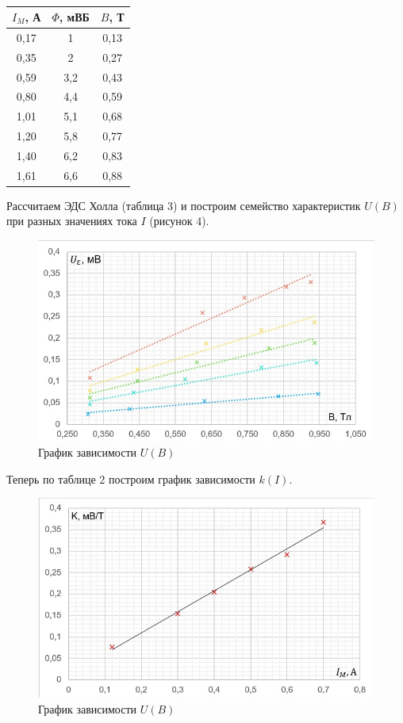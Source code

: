 \documentclass[a4paper]{article}
\theoremstyle{definition}
\theoremstyle{remark}
\begin{document}
    \begin{table}[h!]
        \caption{}
        \centering
        \begin{tabular}{|c|c|c|}
        \hline
        \multicolumn{1}{|l|}{$I_M$, А} & \multicolumn{1}{l|}{$\Phi$, мВБ} & \multicolumn{1}{l|}{$B$, Т} \\ \hline
        0,17 & 1 & 0,13 \\ \hline
        0,35 & 2 & 0,27 \\ \hline
        0,59 & 3,2 & 0,43 \\ \hline
        0,80 & 4,4 & 0,59 \\ \hline
        1,01 & 5,1 & 0,68 \\ \hline
        1,20 & 5,8 & 0,77 \\ \hline
        1,40 & 6,2 & 0,83 \\ \hline
        1,61 & 6,6 & 0,88 \\ \hline
        \end{tabular}
        \end{table}

    Рассчитаем ЭДС Холла (таблица 3) и построим семейство характеристик $U(B)$ при разных значениях тока $I$ (рисунок 4).

    \begin{figure}[h!]
        \centering
        \includegraphics[width = 320pt]{image/graph2.jpg}
        \caption{График зависимости $U(B)$}
    \end{figure}

    Теперь по таблице 2 построим график зависимости $k(I)$.

    \begin{figure}[h!]
        \centering
        \includegraphics[width = 320pt]{image/graph3.jpg}
        \caption{График зависимости $U(B)$}
    \end{figure}
\end{document}
